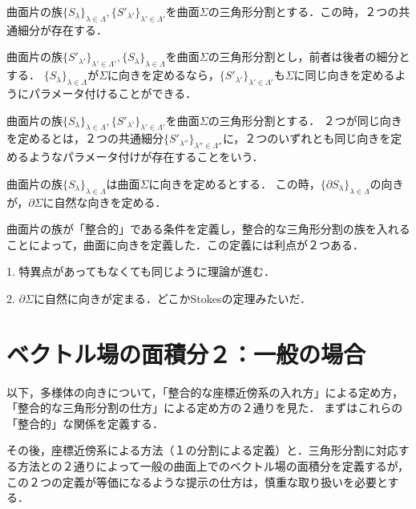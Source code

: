 \documentclass[uplatex, dvipdfmx]{jsreport}
\begin{document}
\begin{lemma}[共通細分]
    曲面片の族$\{S_\lambda\}_{\lambda\in\Lambda},\{S'_{\lambda'}\}_{\lambda'\in\Lambda'}$を曲面$\Sigma$の三角形分割とする．この時，２つの共通細分が存在する．
\end{lemma}

\begin{lemma}
    曲面片の族$\{S'_{\lambda'}\}_{\lambda'\in\Lambda'}, \{S_\lambda\}_{\lambda\in\Lambda}$を曲面$\Sigma$の三角形分割とし，前者は後者の細分とする．
    $\{S_\lambda\}_{\lambda\in\Lambda}$が$\Sigma$に向きを定めるなら，$\{S'_{\lambda'}\}_{\lambda'\in\Lambda'}$も$\Sigma$に同じ向きを定めるようにパラメータ付けることができる．
\end{lemma}

\begin{definition}[曲面の向きの比較]
    曲面片の族$\{S_\lambda\}_{\lambda\in\Lambda},\{S'_{\lambda'}\}_{\lambda'\in\Lambda'}$を曲面$\Sigma$の三角形分割とする．
    ２つが同じ向きを定めるとは，２つの共通細分$\{S'_{\lambda''}\}_{\lambda''\in\Lambda''}$に，２つのいずれとも同じ向きを定めるようなパラメータ付けが存在することをいう．
\end{definition}

\begin{lemma}[境界の自然な向き]
    曲面片の族$\{S_\lambda\}_{\lambda\in\Lambda}$は曲面$\Sigma$に向きを定めるとする．
    この時，$\{\partial S_\lambda\}_{\lambda\in\Lambda}$の向きが，$\partial\Sigma$に自然な向きを定める．
\end{lemma}

\begin{screen}
    曲面片の族が「整合的」である条件を定義し，整合的な三角形分割の族を入れることによって，曲面に向きを定義した．この定義には利点が２つある．

    1. 特異点があってもなくても同じように理論が進む．

    2. $\partial\Sigma$に自然に向きが定まる．どこかStokesの定理みたいだ．
\end{screen}

\section{ベクトル場の面積分２：一般の場合}

以下，多様体の向きについて，「整合的な座標近傍系の入れ方」による定め方，「整合的な三角形分割の仕方」による定め方の２通りを見た．
まずはこれらの「整合的」な関係を定義する．

その後，座標近傍系による方法（１の分割による定義）と．三角形分割に対応する方法との２通りによって一般の曲面上でのベクトル場の面積分を定義するが，この２つの定義が等価になるような提示の仕方は，慎重な取り扱いを必要とする．
\end{document}
